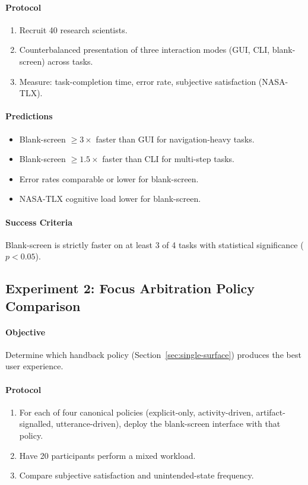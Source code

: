 \documentclass[11pt,twocolumn,a4paper]{article}
\theoremstyle{definition}
\theoremstyle{remark}
\begin{document}
\paragraph{Protocol}
\begin{enumerate}
    \item Recruit 40 research scientists.
    \item Counterbalanced presentation of three interaction modes (GUI, CLI, blank-screen) across tasks.
    \item Measure: task-completion time, error rate, subjective satisfaction (NASA-TLX).
\end{enumerate}

\paragraph{Predictions}
\begin{itemize}
    \item Blank-screen $\geq 3\times$ faster than GUI for navigation-heavy tasks.
    \item Blank-screen $\geq 1.5\times$ faster than CLI for multi-step tasks.
    \item Error rates comparable or lower for blank-screen.
    \item NASA-TLX cognitive load lower for blank-screen.
\end{itemize}

\paragraph{Success Criteria}
Blank-screen is strictly faster on at least 3 of 4 tasks with statistical significance ($p < 0.05$).



\subsection{Experiment 2: Focus Arbitration Policy Comparison}

\paragraph{Objective} Determine which handback policy (Section~\ref{sec:single-surface}) produces the best user experience.

\paragraph{Protocol}
\begin{enumerate}
    \item For each of four canonical policies (explicit-only, activity-driven, artifact-signalled, utterance-driven), deploy the blank-screen interface with that policy.
    \item Have 20 participants perform a mixed workload.
    \item Compare subjective satisfaction and unintended-state frequency.
\end{enumerate}
\end{document}
